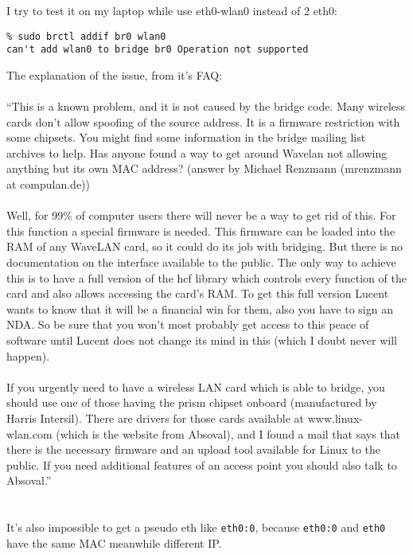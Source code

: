 \documentclass[a4paper]{report}
\begin{document}
I try to test it on my laptop while use eth0-wlan0 instead of 2 eth0:
\begin{lstlisting}
% sudo brctl addif br0 wlan0 
can't add wlan0 to bridge br0 Operation not supported
\end{lstlisting}
The explanation of the issue, from it's FAQ:\\\\
``This is a known problem, and it is not caused by the bridge code. 
Many wireless cards don't allow spoofing of the source address. 
It is a firmware restriction with some chipsets. You might find some information 
in the bridge mailing list archives to help. Has anyone found a way to get around 
Wavelan not allowing anything but its own MAC address?
(answer by Michael Renzmann (mrenzmann at compulan.de))\\\\
Well, for 99\% of computer users there will never be a way to get rid of this. 
For this function a special firmware is needed. This firmware can be loaded into 
the RAM of any WaveLAN card, so it could do its job with bridging. But there is no 
documentation on the interface available to the public. The only way to achieve this is 
to have a full version of the hcf library which controls every function of the card and 
also allows accessing the card's RAM. To get this full version Lucent wants to know that 
it will be a financial win for them, also you have to sign an NDA. So be sure that you 
won't most probably get access to this peace of software until Lucent does not change 
its mind in this (which I doubt never will happen).\\\\
If you urgently need to have a wireless LAN card which is able to bridge, you should 
use one of those having the prism chipset onboard (manufactured by Harris Intersil). 
There are drivers for those cards available at www.linux-wlan.com 
(which is the website from Absoval), and I found a mail that says that there is the 
necessary firmware and an upload tool available for Linux to the public. 
If you need additional features of an access point you should also talk to Absoval.''\\\\\\
It's also impossible to get a pseudo eth like 
{\tt eth0:0}, because {\tt eth0:0} and {\tt eth0} have the same MAC meanwhile different IP.
\end{document}
